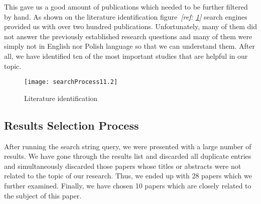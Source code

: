This gave us a good amount of publications which needed to be further filtered by hand.  As shown on the literature identification figure~\textit{[ref: \ref{fig:literature-identification}]} search engines provided us with over two hundred publications. Unfortunately, many of them did not answer the previously established research questions and many of them were simply not in English nor Polish language so that we can understand them. After all, we have identified ten of the most important studies that are helpful in our topic.

\begin{figure}[htp]
\centering
\texttt{[image: searchProcess11.2]}
\caption{Literature identification}
\label{fig:literature-identification}
\end{figure}

\subsection{Results Selection Process}
After running the search string query, we were presented with a large number of results. We have gone through the results list and discarded all duplicate entries and simultaneously discarded those papers whose titles or abstracts were not related to the topic of our research. Thus, we ended up with 28 papers which we further examined. Finally, we have chosen 10 papers which are closely related to the subject of this paper.
